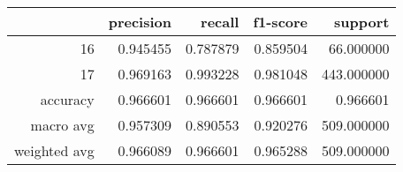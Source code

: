 \begin{tabular}{rrrrr}
\toprule
 & precision & recall & f1-score & support \\
\midrule
16 & 0.945455 & 0.787879 & 0.859504 & 66.000000 \\
17 & 0.969163 & 0.993228 & 0.981048 & 443.000000 \\
accuracy & 0.966601 & 0.966601 & 0.966601 & 0.966601 \\
macro avg & 0.957309 & 0.890553 & 0.920276 & 509.000000 \\
weighted avg & 0.966089 & 0.966601 & 0.965288 & 509.000000 \\
\bottomrule
\end{tabular}
